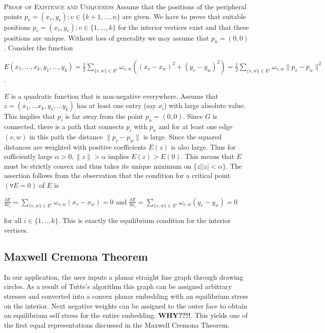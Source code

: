 \documentclass[11pt]{article}
\begin{document}
\textsc {Proof of Existence and Uniqueness}  Assume that the positions of the peripheral points $p_v = (x_v,y_v); v \in \{k+1,...,n\}$ are given. We have to prove that suitable positions $p_v = (x_v,y_v); v \in \{1,...,k\}$ for the interior vertices exist and that these positions are unique. Without loss of generality we may assume that $p_n = (0,0)$. Consider the function
\begin{center}
$E(x_1,...,x_k,y_1,...,y_k) = \frac{1}{2} \sum\limits_{\{v,w\} \in E'} \omega_{v,w}((x_v - x_w)^2 + (y_v - y_w)^2) 
= \frac{1}{2} \sum\limits_{\{v,w\} \in E'} \omega_{v,w} \|p_v - p_w\|^2$. \\
\end{center}
$E$ is a quadratic function that is non-negative everywhere. Assume that $z=(x_1,...x_k,y_1,...y_k)$ has at least one entry (say $x_i$) with large absolute value. This implies that $p_i$ is far away from the point $p_n = (0,0)$. Since $G$ is connected, there is a path that connects $p_i$ with $p_n$ and for at least one edge $(v,w)$ in this path the distance $\|p_v - p_w\|$ is large. Since the squared distances are weighted with positive coefficients $E(z)$ is also large. Thus for sufficiently large $\alpha > 0, \|z\| > \alpha$ implies $E(z) > E(0)$. This means that $E$ must be strictly convex and thus takes its unique minimum on $\{z | |z| < \alpha \}$. The assertion follows from the observation that the condition for a critical point $(\triangledown E = 0)$ of $E$ is
\begin{center}
$\frac{\delta E}{\delta x_i} = \sum\limits_{\{v,w\} \in E'} \omega_{v,w}(x_v - x_w) = 0$ and $\frac{\delta E}{\delta x_i} = \sum\limits_{\{v,w\} \in E'} \omega_{v,w}(y_v - y_w) = 0$
\end{center}
for all $i \in \{1,..,k\}$. This is exactly the equilibrium condition for the interior vertices.

\subsection{Maxwell Cremona Theorem}
In our application, the user inputs a planar straight line graph through drawing circles. As a result of Tutte's algorithm this graph can be assigned arbitrary stresses and converted into a convex planar embedding with an equilibrium stress on the interior. Next negative weights can be assigned to the outer face to obtain an equilibrium self stress for the entire embedding. \textbf{WHY??!!}. This yields one of the first equal representations discussed in the Maxwell Cremona Theorem.
\end{document}
